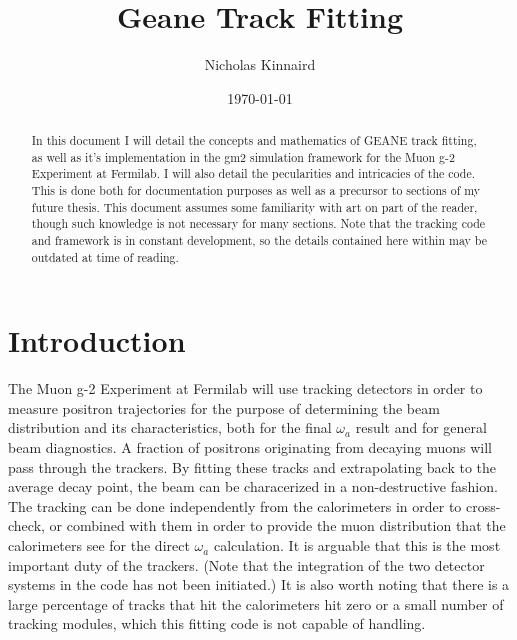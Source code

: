 \documentclass{article}
\begin{document}
\title{Geane Track Fitting}
\author{Nicholas Kinnaird}
\date{\today}
\maketitle

\begin{abstract}

    In this document I will detail the concepts and mathematics of GEANE track fitting, as well as it's implementation in the gm2 simulation framework for the Muon g-2 Experiment at Fermilab. I will also detail the pecularities and intricacies of the code. This is done both for documentation purposes as well as a precursor to sections of my future thesis. This document assumes some familiarity with art on part of the reader, though such knowledge is not necessary for many sections. Note that the tracking code and framework is in constant development, so the details contained here within may be outdated at time of reading. 

\end{abstract}



\section{Introduction}

  The Muon g-2 Experiment at Fermilab will use tracking detectors in order to measure positron trajectories for the purpose of determining the beam distribution and its characteristics, both for the final $\omega_{a}$ result and for general beam diagnostics. A fraction of positrons originating from decaying muons will pass through the trackers. By fitting these tracks and extrapolating back to the average decay point, the beam can be characerized in a non-destructive fashion. The tracking can be done independently from the calorimeters in order to cross-check, or combined with them in order to provide the muon distribution that the calorimeters see for the direct $\omega_{a}$ calculation. It is arguable that this is the most important duty of the trackers. (Note that the integration of the two detector systems in the code has not been initiated.) It is also worth noting that there is a large percentage of tracks that hit the calorimeters hit zero or a small number of tracking modules, which this fitting code is not capable of handling.
\end{document}
